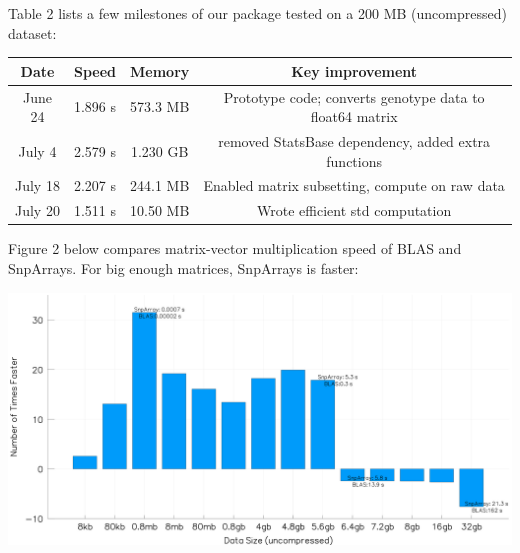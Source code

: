 \documentclass[a0,portrait]{a0poster}
\begin{document}
\begin{multicols}{2}
Table 2 lists a few milestones of our package tested on a 200 MB (uncompressed) dataset:

\vspace{0.5cm}
\begin{center}
\begin{tabular}{c c c c}
\toprule
\textbf{Date} & \textbf{Speed} & \textbf{Memory} & \textbf{Key  improvement}\\
\midrule
June 24 & 1.896 s & 573.3 MB & Prototype code; converts genotype data to float64 matrix\\
July 4 & 2.579 s & 1.230 GB & removed StatsBase dependency, added extra functions\\
July 18 & 2.207 s & 244.1 MB & Enabled matrix subsetting, compute on raw data\\
July 20 & 1.511 s & 10.50 MB & Wrote efficient std computation\\
\bottomrule
\end{tabular}
\end{center}
\vspace{1.5cm}

Figure 2 below compares matrix-vector multiplication speed of BLAS and SnpArrays. For big enough matrices, SnpArrays is faster:

\begin{center}\vspace{1cm}
\includegraphics[width=0.9\linewidth]{figures/compare.png}
\end{center}\vspace{1cm}


\centering
\color{Navy}

\end{multicols}
\end{document}
